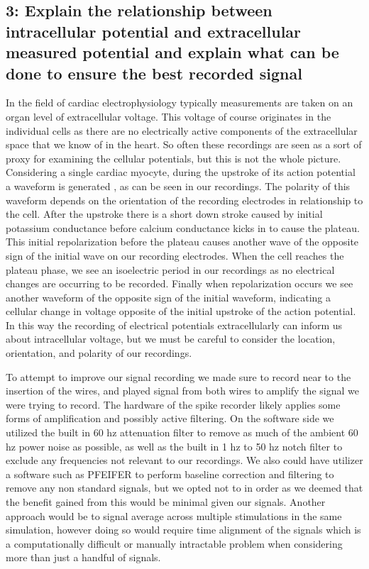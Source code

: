 \documentclass[12pt]{article}
\begin{document}
\subsection{3: Explain the relationship between intracellular potential and extracellular measured potential and explain what can be done to ensure the best recorded signal}
\par{}
In the field of cardiac electrophysiology typically measurements are taken on an organ level of extracellular voltage. This voltage of course originates in the individual cells as there are no electrically active components of the extracellular space that we know of in the heart. So often these recordings are seen as a sort of proxy for examining the cellular potentials, but this is not the whole picture. Considering a single cardiac myocyte, during the upstroke of its action potential a waveform is generated , as can be seen in our recordings. The polarity of this waveform depends on the orientation of the recording electrodes in relationship to the cell. After the upstroke there is a short down stroke caused by initial potassium conductance before calcium conductance kicks in to cause the plateau. This initial repolarization before the plateau causes another wave of the opposite sign of the initial wave on our recording electrodes. When the cell reaches the plateau phase, we see an isoelectric period in our recordings as no electrical changes are occurring to be recorded. Finally when repolarization occurs we see another waveform of the opposite sign of the initial waveform, indicating a cellular change in voltage opposite of the initial upstroke of the action potential. In this way the recording of electrical potentials extracellularly can inform us about intracellular voltage, but we must be careful to consider the location, orientation, and polarity of our recordings.
\par{}
To attempt to improve our signal recording we made sure to record near to the insertion of the wires, and played signal from both wires to amplify the signal we were trying to record. The hardware of the spike recorder likely applies some forms of amplification and possibly active filtering. On the software side we utilized the built in 60 hz attenuation filter to remove as much of the ambient 60 hz power noise as possible, as well as the built in 1 hz to 50 hz notch filter to exclude any frequencies not relevant to our recordings. We also could have utilizer a software such as PFEIFER to perform baseline correction and filtering to remove any non standard signals, but we opted not to in order as we deemed that the benefit gained from this would be minimal given our signals. Another approach would be to signal average across multiple stimulations in the same simulation, however doing so would require time alignment of the signals which is a computationally difficult or manually intractable problem when considering more than just a handful of signals.
\end{document}
